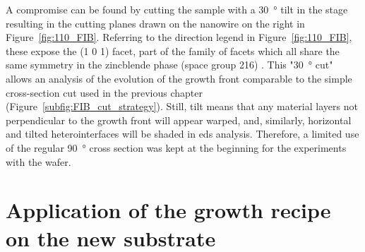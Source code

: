 A compromise can be found by cutting the sample with a \qty{30}{\degree} tilt in the stage resulting in the cutting planes drawn on the nanowire on the right in Figure~\ref{fig:110_FIB}. Referring to the direction legend in Figure~\ref{fig:110_FIB}, these expose the \hkl(1 0 1) facet, part of the family of  facets which all share the same symmetry in the zincblende phase (space group \num{216}) \cite{wyckoff1963crystal, osti_gaas_zb, osti_inas_zb, osti_inp_zb}. This "\qty{30}{\degree} cut" allows an analysis of the evolution of the growth front comparable to the simple cross-section cut used in the previous chapter (Figure~\ref{subfig:FIB_cut_strategy}). Still, tilt means that any material layers not perpendicular to the growth front will appear warped, and, similarly, horizontal and tilted heterointerfaces will be shaded in \acs{eds} analysis. Therefore, a limited use of the regular \qty{90}{\degree} cross section was kept at the beginning for the experiments with the  wafer.

\section{Application of the growth recipe on the new substrate}

